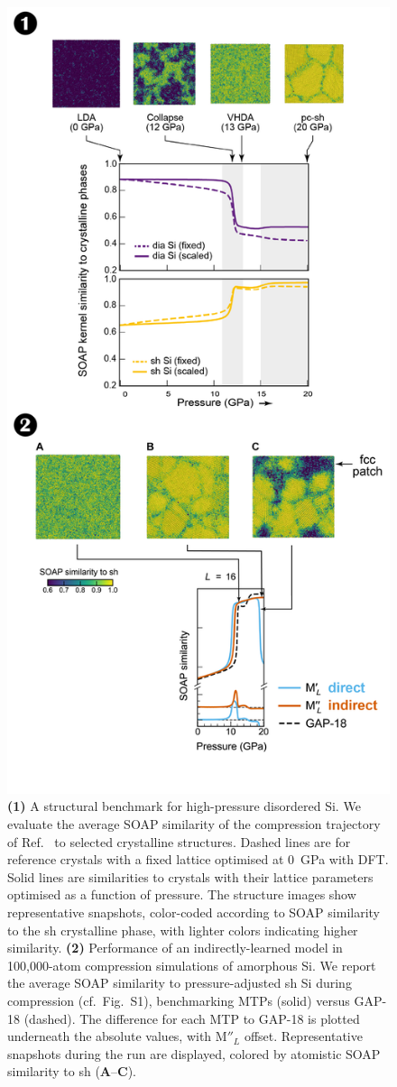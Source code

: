 \documentclass[12pt,a4paper,twoside,nobind]{ociamthesis}
\newcommand{\ind}[1]{\mathrm{#1''\!\!}}
\newcommand{\direct}[1]{\mathrm{#1'\!}}
\begin{document}
\begin{figure}[!ht]
  \centering
  \includegraphics[width=0.5\linewidth]{simplified_compression_series.png}
  \caption{
    \textbf{(1)} A structural benchmark for high-pressure disordered Si.
    We evaluate the average SOAP similarity of the compression trajectory of Ref.\ \cite{Deringer2021} to selected crystalline structures.
    Dashed lines are for reference crystals with a fixed lattice optimised at \SI{0}{GPa} with DFT. 
    Solid lines are similarities to crystals with their lattice parameters optimised as a function of pressure. 
    The structure images show representative snapshots, color-coded according to SOAP similarity to the sh crystalline phase,
    with lighter colors indicating higher similarity.
  \textbf{(2)}%
    Performance of an indirectly-learned model in 100,000-atom compression simulations of amorphous Si.
  We report the average SOAP similarity to pressure-adjusted sh Si during compression (cf.\ Fig.\ S1), benchmarking MTPs (solid) versus GAP-18 (dashed).
  The difference for each MTP to GAP-18 is plotted underneath the absolute values, with $\ind{M}_{L}$ offset.
  Representative snapshots during the run are displayed, colored by atomistic SOAP similarity to sh (\textbf{A}--\textbf{C}). 
  }
  \label{fig:SOAP_difference}
\end{figure}
\end{document}
